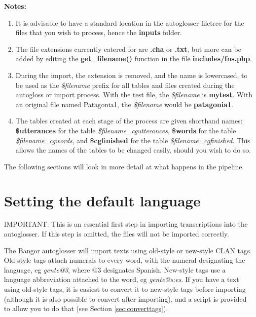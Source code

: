 \documentclass[a4paper,10pt]{article}
\begin{document}
\textbf{Notes:}
\begin{enumerate}
\item It is advisable to have a standard location in the autoglosser filetree for the files that you wish to process, hence the \textbf{inputs} folder. 

\item The file extensions currently catered for are \textbf{.cha} or \textbf{.txt}, but more can be added by editing the \textbf{get\_filename()} function in the file \textbf{includes/fns.php}.

\item \label{normname} During the import, the extension is removed, and the name is lowercased, to be used as the \textit{\$filename} prefix for all tables and files created during the autogloss or import process.  With the test file, the \textit{\$filename} is \textbf{mytest}.  With an original file named Patagonia1, the \textit{\$filename} would be \textbf{patagonia1}.

\item The tables created at each stage of the process are given shorthand names: \textbf{\$utterances} for the table \textit{\$filename\_cgutterances}, \textbf{\$words} for the table \textit{\$filename\_cgwords}, and \textbf{\$cgfinished} for the table \textit{\$filename\_cgfinished}.  This allows the names of the tables to be changed easily, should you wish to do so.
\end{enumerate}

The following sections will look in more detail at what happens in the pipeline.


\section{Setting the default language}
\label{sec:defaultlg}

IMPORTANT: This is an essential first step in importing transcriptions into the autoglosser.  If this step is omitted, the files will not be imported correctly.

The Bangor autoglosser will import texts using old-style or new-style CLAN tags.  Old-style tags attach numerals to every word, with the numeral designating the language, eg \textit{gente@3}, where @3 designates Spanish.  New-style tags use a language abbreviation attached to the word, eg \textit{gente@s:es}.  If you have a text using old-style tags, it is easiest to convert it to new-style tags before importing (although it is also possible to convert after importing), and a script is provided to allow you to do that (see Section \ref{sec:converttags}).  
\end{document}
